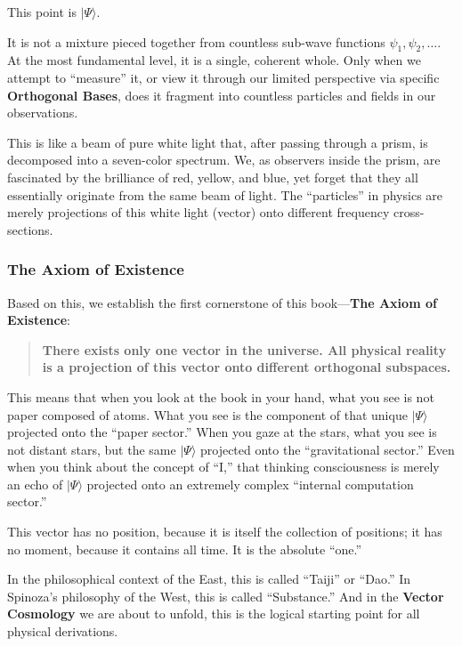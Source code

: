 This point is $|\Psi\rangle$.

It is not a mixture pieced together from countless sub-wave functions $\psi_1, \psi_2, \dots$. At the most fundamental level, it is a single, coherent whole. Only when we attempt to ``measure'' it, or view it through our limited perspective via specific \textbf{Orthogonal Bases}, does it fragment into countless particles and fields in our observations.

This is like a beam of pure white light that, after passing through a prism, is decomposed into a seven-color spectrum. We, as observers inside the prism, are fascinated by the brilliance of red, yellow, and blue, yet forget that they all essentially originate from the same beam of light. The ``particles'' in physics are merely projections of this white light (vector) onto different frequency cross-sections.

\subsubsection{The Axiom of Existence}

Based on this, we establish the first cornerstone of this book---\textbf{The Axiom of Existence}:

\begin{quote}
\textbf{There exists only one vector in the universe. All physical reality is a projection of this vector onto different orthogonal subspaces.}
\end{quote}

This means that when you look at the book in your hand, what you see is not paper composed of atoms. What you see is the component of that unique $|\Psi\rangle$ projected onto the ``paper sector.'' When you gaze at the stars, what you see is not distant stars, but the same $|\Psi\rangle$ projected onto the ``gravitational sector.'' Even when you think about the concept of ``I,'' that thinking consciousness is merely an echo of $|\Psi\rangle$ projected onto an extremely complex ``internal computation sector.''

This vector has no position, because it is itself the collection of positions; it has no moment, because it contains all time. It is the absolute ``one.''

In the philosophical context of the East, this is called ``Taiji'' or ``Dao.'' In Spinoza's philosophy of the West, this is called ``Substance.'' And in the \textbf{Vector Cosmology} we are about to unfold, this is the logical starting point for all physical derivations.

